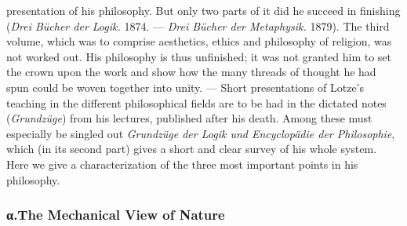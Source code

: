 \documentclass[12pt,a4paper]{book}
\newcommand{\opage}[1]{\marginnote{\footnotesize\textit{[#1]}}}
\begin{document}
presentation of his philosophy. But only two parts of it did he succeed in
finishing (\textit{Drei Bücher der Logik.} 1874. --- \textit{Drei Bücher der
Metaphysik.} 1879). The third volume, which was to comprise aesthetics, ethics
and philosophy of religion, was not worked out. His philosophy is thus
unfinished; it was not granted him to set the crown upon the work and show how
the many threads of thought he had spun could be woven together into unity. ---
Short presentations of Lotze's teaching in the different philosophical \opage{513}fields
are to be had in the dictated notes (\textit{Grundzüge}) from his lectures,
published after his death. Among these must especially be singled out
\textit{Grundzüge der Logik und Encyclopädie der Philosophie}, which (in its
second part) gives a short and clear survey of his whole system. Here we give a
characterization of the three most important points in his philosophy.

\subsubsection*{α.\quad The Mechanical View of Nature}
\end{document}
